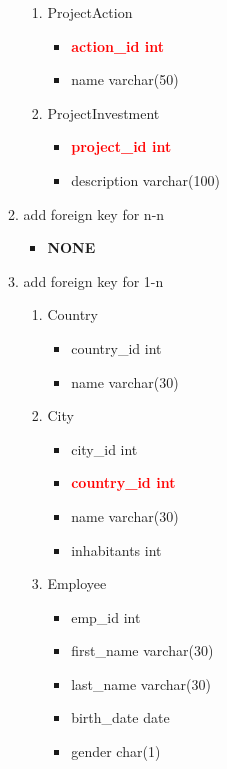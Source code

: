 \documentclass[]{article}
\begin{document}
\begin{enumerate}
\begin{enumerate}
\begin{enumerate}
\item ProjectAction
\begin{itemize}
\item \textcolor{red}{\textbf{action\_id int}}
\item name varchar(50)
\end{itemize}

\item ProjectInvestment
\begin{itemize}
\item \textcolor{red}{\textbf{project\_id int}}
\item description varchar(100)
\end{itemize}
\end{enumerate}

\item add foreign key for n-n

\begin{itemize}
\item \textbf{NONE}
\end{itemize}

\item add foreign key for 1-n

\begin{enumerate}
\item Country
\begin{itemize}
\item country\_id int
\item name varchar(30)
\end{itemize}

\item City
\begin{itemize}
\item city\_id int
\item \textcolor{red}{\textbf{country\_id int}}
\item name varchar(30)
\item inhabitants int
\end{itemize}

\item Employee
\begin{itemize}
\item emp\_id int
\item first\_name varchar(30)
\item last\_name varchar(30)
\item birth\_date date
\item gender char(1)
\end{itemize}


\end{enumerate}
\end{enumerate}
\end{enumerate}
\end{document}
